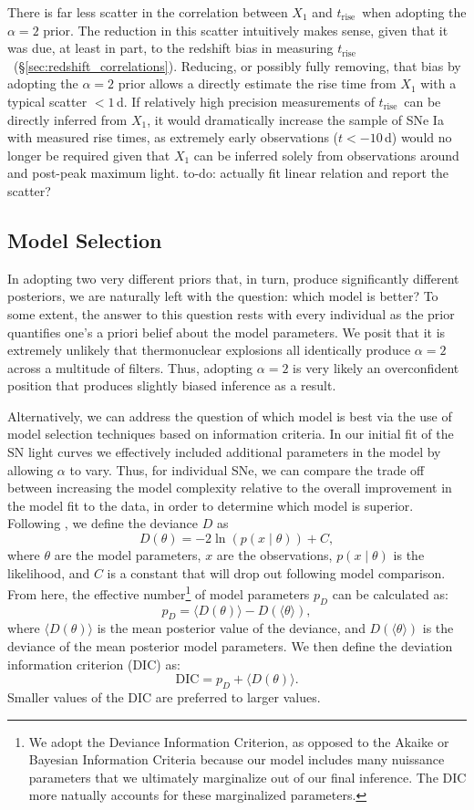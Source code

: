 \documentclass[twocolumn]{./aastex63}
\newcommand{\todo}[1]{{\color{magenta} to-do: {#1}}}
\newcommand{\trise}{$t_\mathrm{rise}$}
\begin{document}
There is far less scatter in the correlation between $X_1$ and \trise\ when
adopting the $\alpha = 2$ prior. The reduction in this scatter intuitively
makes sense, given that it was due, at least in part, to the redshift bias in
measuring \trise\ (\S\ref{sec:redshift_correlations}). Reducing, or possibly
fully removing, that bias by adopting the $\alpha = 2$ prior allows a directly
estimate the rise time from $X_1$ with a typical scatter $< 1$\,d. If
relatively high precision measurements of \trise\ can be directly inferred
from $X_1$, it would dramatically increase the sample of SNe Ia with measured
rise times, as extremely early observations ($t < -10$\,d) would no longer be
required given that $X_1$ can be inferred solely from observations around and
post-peak maximum light. \todo{actually fit linear relation and report the
scatter?}

\subsection{Model Selection}\label{sec:dic}

In adopting two very different priors that, in turn, produce significantly
different posteriors, we are naturally left with the question: which model is
better? To some extent, the answer to this question rests with every individual
as the prior quantifies one's a priori belief about the model parameters. We
posit that it is extremely unlikely that thermonuclear explosions all
identically produce $\alpha = 2$ across a multitude of filters. Thus, adopting
$\alpha = 2$ is very likely an overconfident position that produces slightly
biased inference as a result.

Alternatively, we can address the question of which model is best via the use
of model selection techniques based on information criteria. In our initial
fit of the SN light curves we effectively included additional parameters in
the model by allowing $\alpha$ to vary. Thus, for individual SNe, we can
compare the trade off between increasing the model complexity relative to the
overall improvement in the model fit to the data, in order to determine which
model is superior. Following \citet{Spiegelhalter02}, we define the deviance
$D$ as
%
$$D(\theta) = -2 \ln (p(x\mid \theta)) + C,$$
%
where $\theta$ are the model parameters, $x$ are the observations, $p(x\mid
\theta)$ is the likelihood, and $C$ is a constant that will drop out following
model comparison. From here, the effective number\footnote{We adopt the
Deviance Information Criterion, as opposed to the Akaike or Bayesian
Information Criteria because our model includes many nuissance parameters that
we ultimately marginalize out of our final inference. The DIC more natually
accounts for these marginalized parameters.} of model parameters $p_D$ can be
calculated as:
%
$$p_D = \langle D(\theta) \rangle - D(\langle \theta \rangle),$$
%
where $\langle D(\theta) \rangle$ is the mean posterior value of the deviance,
and $D(\langle \theta \rangle)$ is the deviance of the mean posterior model
parameters. We then define the deviation information criterion (DIC) as:
%
$$\mathrm{DIC} = p_D + \langle D(\theta) \rangle.$$
Smaller values of  the DIC are  preferred to larger values.
\end{document}
